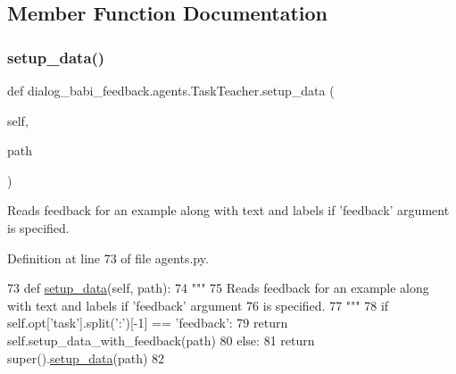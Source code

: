 \subsection{Member Function Documentation}
\mbox{\label{classdialog__babi__feedback_1_1agents_1_1TaskTeacher_a447ce9e39879b80a3ee58311320afa20}} 
\subsubsection{\texorpdfstring{setup\+\_\+data()}{setup\_data()}}
{\footnotesize\ttfamily def dialog\+\_\+babi\+\_\+feedback.\+agents.\+Task\+Teacher.\+setup\+\_\+data (\begin{DoxyParamCaption}\item[{}]{self,  }\item[{}]{path }\end{DoxyParamCaption})}

\begin{DoxyVerb}Reads feedback for an example along with text and labels if 'feedback' argument
is specified.
\end{DoxyVerb}
 

Definition at line 73 of file agents.\+py.


\begin{DoxyCode}
73     \textcolor{keyword}{def }\hyperlink{namespaceparlai_1_1tasks_1_1multinli_1_1agents_a4fa2cb0ba1ed745336ad8bceed36b841}{setup\_data}(self, path):
74         \textcolor{stringliteral}{"""}
75 \textcolor{stringliteral}{        Reads feedback for an example along with text and labels if 'feedback' argument}
76 \textcolor{stringliteral}{        is specified.}
77 \textcolor{stringliteral}{        """}
78         \textcolor{keywordflow}{if} self.opt[\textcolor{stringliteral}{'task'}].split(\textcolor{stringliteral}{':'})[-1] == \textcolor{stringliteral}{'feedback'}:
79             \textcolor{keywordflow}{return} self.setup\_data\_with\_feedback(path)
80         \textcolor{keywordflow}{else}:
81             \textcolor{keywordflow}{return} super().\hyperlink{namespaceparlai_1_1tasks_1_1multinli_1_1agents_a4fa2cb0ba1ed745336ad8bceed36b841}{setup\_data}(path)
82 
\end{DoxyCode}
\mbox{\label{classdialog__babi__feedback_1_1agents_1_1TaskTeacher_a13fe8b4ae98a4a170b4885c40b611415}} 

